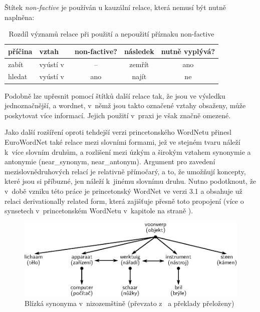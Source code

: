 \documentclass[a4paper, 11pt, oneside, showtrims]{book}
\newcommand{\itNameRef}[1]{\textit{\nameref{#1}}}
\newcommand\ex{\textsf}
\begin{document}
				Štítek \textit{non-factive} je používán u kauzální relace, která nemusí být nutně naplněna:


					\begin{table}[h!]
						\centering
						\label{tab:wnlabels}
						\begin{tabular}{llcc|c}
							\textbf{příčina}	& \textbf{vztah}  & \textbf{non-factive?} & \textbf{následek} & \textbf{nutně vyplývá?} \\ \hline
							\ex{zabít}  & vyústí v~& –  & \ex{zemřít} & ano                       \\
							\ex{hledat} & vyústí v~& ano & \ex{najít}  & ne
						\end{tabular}
						\caption{Rozdíl významů relace při použití a nepoužití příznaku \ex{non-factive}}
					\end{table}

				Podobně lze upřesnit pomocí štítků další relace tak, že jsou ve výsledku jednoznačnější, a wordnet, v~němž jsou takto označené vztahy obsaženy, může poskytovat více informací. Jejich použití v~praxi je však značně omezené. \parencite{rambousek2017Ustni}


				Jako další rozšíření oproti tehdejší verzi princetonského WordNetu přinesl EuroWordNet také relace mezi slovními formami, jež ve stejném tvaru náleží k~více slovním druhům, a rozlišení mezi úzkým a širokým vztahem synonymie a antonymie (\ex{near\_synonym}, \ex{near\_antonym}). Argument pro zavedení mezislovnědruhových relací je relativně přímočarý, a to, že umožňují  koncepty, které jsou si příbuzné, jen náleží k~jinému slovnímu druhu. Nutno podotknout, že v~době vzniku této práce je princetonský WordNet ve verzi 3.1 a obsahuje už relaci \ex{derivationally related form}, která zajišťuje přesně toto propojení (více o synsetech v~princetonském WordNetu v~kapitole \itNameRef{cha:princeton-synset-rels} na straně \pageref{cha:princeton-synset-rels}). 

				\begin{figure}[h]
					\centering
					\includegraphics[width=1.0\textwidth]{pazienza-wn-study.eps}
					\caption{Blízká synonyma v~nizozemštině (převzato z~\textcite{pazienza2008bottom} a překlady přeloženy)}
					\label{fig:near-synon}
				\end{figure}
\end{document}
